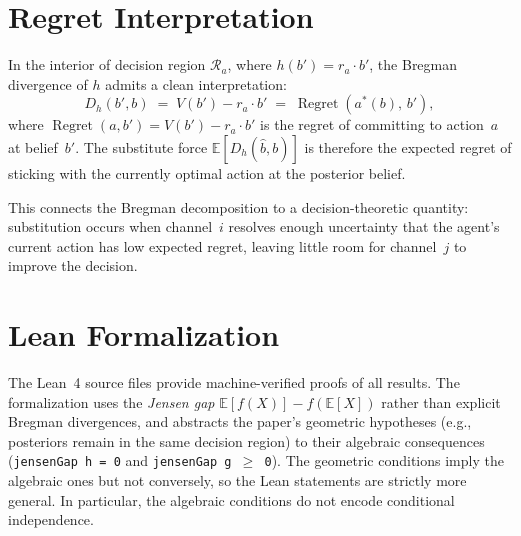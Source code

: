 \documentclass{article}
\newcommand{\bpost}{\hat{b}}
\newcommand{\E}{\mathbb{E}}
\newcommand{\Dh}{D_h}
\begin{document}
\section{Regret Interpretation}
\label{app:regret}

In the interior of decision region $\mathcal{R}_a$, where $h(b') = r_a \cdot b'$, the Bregman divergence of $h$ admits a clean interpretation:
\[
  \Dh(b', b)
  \;=\; V(b') - r_a \cdot b'
  \;=\; \operatorname{Regret}(a^*(b),\, b'),
\]
where $\operatorname{Regret}(a, b') = V(b') - r_a \cdot b'$ is the regret of committing to action~$a$ at belief~$b'$.
The substitute force $\E[\Dh(\bpost, b)]$ is therefore the expected regret of sticking with the currently optimal action at the posterior belief.

This connects the Bregman decomposition to a decision-theoretic quantity: substitution occurs when channel~$i$ resolves enough uncertainty that the agent's current action has low expected regret, leaving little room for channel~$j$ to improve the decision.

\section{Lean Formalization}
\label{app:lean}

The Lean~4 source files provide machine-verified proofs of all results.
The formalization uses the \emph{Jensen gap} $\E[f(X)] - f(\E[X])$ rather than explicit Bregman divergences, and abstracts the paper's geometric hypotheses (e.g., posteriors remain in the same decision region) to their algebraic consequences (\texttt{jensenGap h = 0} and \texttt{jensenGap g $\geq$ 0}).
The geometric conditions imply the algebraic ones but not conversely, so the Lean statements are strictly more general.
In particular, the algebraic conditions do not encode conditional independence.
\end{document}
